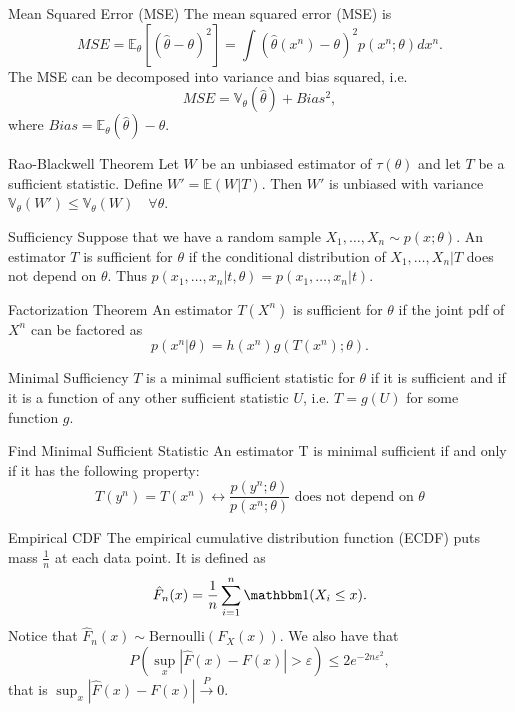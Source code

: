 \documentclass[avery5371,grid]{flashcards}
\begin{document}
\begin{flashcard}[Theorem]{Mean Squared Error (MSE)}
The mean squared error (MSE) is
\[
MSE = \mathbb{E}_\theta \left[ (\hat \theta - \theta)^2 \right] = \int (\hat \theta(x^n) - \theta)^2 p(x^n;\theta) dx^n.
\]
The MSE can be decomposed into variance and bias squared, i.e.
\[
MSE = \mathbb{V}_\theta(\hat \theta) + Bias^2,
\]
where $Bias = \mathbb{E}_\theta(\hat \theta) - \theta$.
\end{flashcard}

\begin{flashcard}[Theorem]{Rao-Blackwell Theorem}
Let $W$ be an unbiased estimator of $\tau(\theta)$ and let $T$ be a sufficient statistic. Define
$W' = \mathbb{E}(W|T)$. Then $W'$ is unbiased with variance $\mathbb{V}_\theta (W') \le 
\mathbb{V}_\theta(W) \quad \forall \theta$.

\end{flashcard}

\begin{flashcard}[Definition]{Sufficiency}
Suppose that we have a random sample $X_1, \ldots, X_n \sim p(x;\theta)$. An estimator $T$
is sufficient for $\theta$ if the conditional distribution of $X_1,\ldots,X_n|T$ does not depend on $\theta$.
Thus $p(x_1,\ldots, x_n|t,\theta) = p(x_1, \ldots, x_n | t)$.
\end{flashcard}

\begin{flashcard}[Theorem]{Factorization Theorem}
An estimator $T(X^n)$ is sufficient for $\theta$ if the joint pdf of $X^n$ can be factored as
\[
p(x^n|\theta) = h(x^n) g \left(T(x^n);\theta \right).
\]
\end{flashcard}

\begin{flashcard}[Definition]{Minimal Sufficiency}
$T$ is a minimal sufficient statistic for $\theta$ if it is sufficient and
if it is a function of any other sufficient statistic $U$, i.e. $T=g(U)$ for some function $g$.
\end{flashcard}


\begin{flashcard}[Theorem]{Find Minimal Sufficient Statistic}
An estimator T is minimal sufficient if and only if it has the following property:
\[
T(y^n) = T(x^n) \leftrightarrow \frac{p(y^n;\theta)}{p(x^n;\theta)} \text{ does not depend on } \theta
\]
\end{flashcard}

\begin{flashcard}[Definition]{Empirical CDF}
\scriptsize
The empirical cumulative distribution function (ECDF) puts mass $\frac{1}{n}$ at each 
data point. It is defined as
\[
\hat F_n(x) = \frac{1}{n} \sum_{i=1}^n \mathbbm 1 (X_i \le x).
\]
Notice that $\hat F_n(x) \sim \text{Bernoulli}(F_X(x))$. We also have that 
\[
P\left( \sup_x |\hat F(x) - F(x) | > \varepsilon \right) \le 2e^{-2n\varepsilon^2},
\]
that is $\sup_x |\hat F(x) - F(x) | \overset{P} \longrightarrow 0$.
\end{flashcard}
\end{document}
